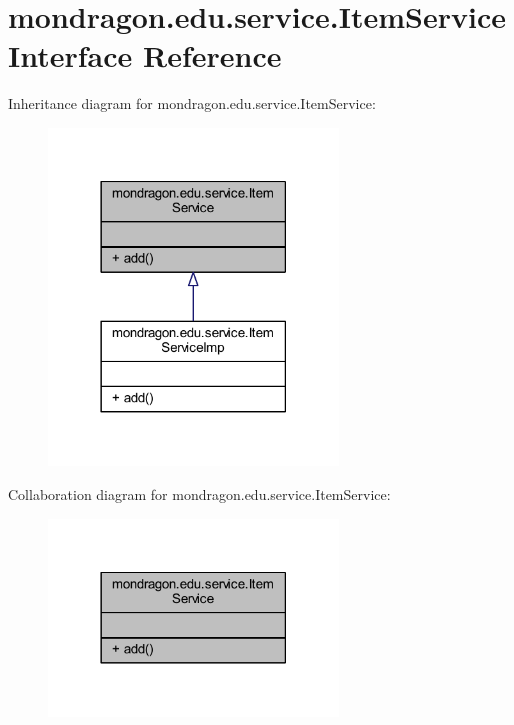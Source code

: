 \hypertarget{interfacemondragon_1_1edu_1_1service_1_1_item_service}{}\section{mondragon.\+edu.\+service.\+Item\+Service Interface Reference}
\label{interfacemondragon_1_1edu_1_1service_1_1_item_service}


Inheritance diagram for mondragon.\+edu.\+service.\+Item\+Service\+:\nopagebreak
\begin{figure}[H]
\begin{center}
\leavevmode
\includegraphics[width=218pt]{interfacemondragon_1_1edu_1_1service_1_1_item_service__inherit__graph}
\end{center}
\end{figure}


Collaboration diagram for mondragon.\+edu.\+service.\+Item\+Service\+:\nopagebreak
\begin{figure}[H]
\begin{center}
\leavevmode
\includegraphics[width=218pt]{interfacemondragon_1_1edu_1_1service_1_1_item_service__coll__graph}
\end{center}
\end{figure}
